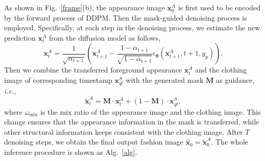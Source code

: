 As shown in Fig.~\ref{frame}{(b)}, the appearance image $\mathbf{x}^{A}_0$ is first used to be encoded by the forward process of DDPM. Then the mask-guided denoising process is employed. 
Specifically, at each step in the denoising process, we estimate the new prediction $\mathbf{x}^{A}_t$ from the diffusion model as follows, 
\begin{equation}
\label{eq9}
\mathbf{x}^{A}_t=\frac{1}{\sqrt{\alpha_{t+1}}}(\mathbf{x}^{A}_{t+1}-\frac{1-\alpha_{t+1}}{\sqrt{1-\overline{\alpha}_{t+1}}}\epsilon_{\boldsymbol{\theta}}(\mathbf{x}^{A}_{t+1},t+1,y_p)).
\end{equation}
Then we combine the transferred foreground appearance $\mathbf{x}^{A}_t$ and the clothing image of corresponding timestamp $\mathbf{x}^{S}_{qt}$ with the generated mask $\boldsymbol{M}$ as guidance, \textit{i.e.}, 
\begin{equation}
\label{eq10}
    \tilde{\mathbf{x}}^{A}_t = \boldsymbol{M} \cdot  \mathbf{x}^{A}_t + (1 - \boldsymbol{M})\cdot \mathbf{x}^{S}_{qt} ,
\end{equation}
where $\omega_{\text{mix}}$ is the mix ratio of the appearance image and the clothing image.
This change ensures that the appearance information in the mask is transferred, while other structural information keeps consistent with the clothing image. After $T$ denoising steps, we obtain the final output fashion image $\hat{\mathbf{x}}_0=\tilde{\mathbf{x}}^{A}_0$. The whole inference procedure is shown as Alg.~\ref{alg}.

